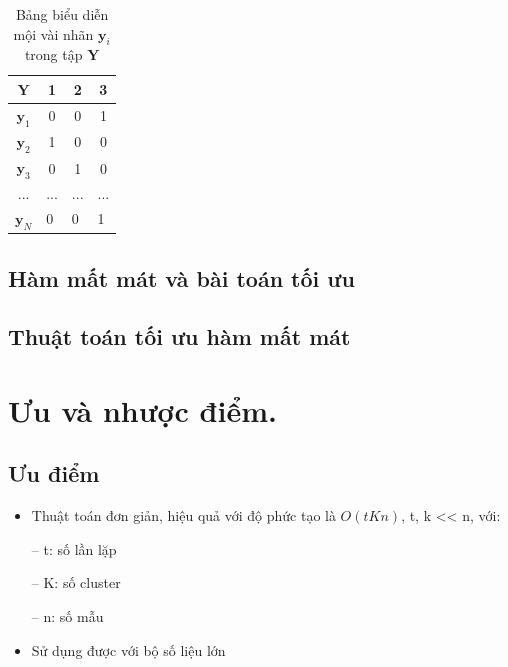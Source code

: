 \documentclass{article}
\begin{document}
\begin{table}[h]
\centering
\begin{tabular}{|c|c|c|c|}
\hline
$\mathbf{Y}$                           & 1                      & 2                       & 3                       \\ \hline
$\mathbf{y}_1$                         & 0                      & 0                       & 1                       \\ \hline
$\mathbf{y}_2$                         & 1                      & 0                       & 0                       \\ \hline
$\mathbf{y}_3$                         & 0                      & 1                       & 0                       \\ \hline
...                                    & ...                    & ...                     & ...                     \\ \hline
\multicolumn{1}{|l|}{$\mathbf{y}_N$}   & \multicolumn{1}{l|}{0} & \multicolumn{1}{l|}{0}  & \multicolumn{1}{l|}{1}  \\ \hline
\end{tabular}
\caption{Bảng biểu diễn mội vài nhãn $\mathbf{y}_i$ trong tập $\mathbf{Y}$}
\label{tab:tbexample}
\end{table}

\newpage
\subsection{Hàm mất mát và bài toán tối ưu} %
\label{sub:hàm_mất_mát_và_bài_toán_tối_ưu}

\subsection{Thuật toán tối ưu hàm mất mát} %
\label{sub:thuật_toán_tối_ưu_hàm_mất_mát}

\newpage
\section{Ưu và nhược điểm.} %
\label{sec:ưu_và_nhược_điểm_}
\subsection{Ưu điểm}
\begin{itemize}
	\item Thuật toán đơn giản, hiệu quả với độ phức tạo là $O(tKn)$, t, k << n, với:
	\item[--]t: số lần lặp
	\item[--]K: số cluster
	\item[--]n: số mẫu
	\item Sử dụng được với bộ số liệu lớn
\end{itemize}
\end{document}
